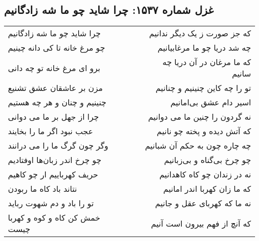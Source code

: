 \begin{center}
\section*{غزل شماره ۱۵۳۷: چرا شاید چو ما شه زادگانیم}
\label{sec:1537}
\begin{longtable}{l p{0.5cm} r}
چرا شاید چو ما شه زادگانیم
&&
که جز صورت ز یک دیگر ندانیم
\\
چو مرغ خانه تا کی دانه چینیم
&&
چه شد دریا چو ما مرغابیانیم
\\
برو ای مرغ خانه تو چه دانی
&&
که ما مرغان در آن دریا چه سانیم
\\
مزن بر عاشقان عشق تشنیع
&&
تو را چه کاین چنینیم و چنانیم
\\
چنینیم و چنان و هر چه هستیم
&&
اسیر دام عشق بی‌امانیم
\\
چرا از جهل بر ما می دوانی
&&
نه گردون را چنین ما می دوانیم
\\
عجب نبود اگر ما را بخایند
&&
که آتش دیده و پخته چو نانیم
\\
وگر چون گرگ ما را می درانند
&&
چه چاره چون به حکم آن شبانیم
\\
چو چرخ اندر زبان‌ها اوفتادیم
&&
چو چرخ بی‌گناه و بی‌زبانیم
\\
حریف کهرباییم ار چو کاهیم
&&
نه در زندان چو کاه کاهدانیم
\\
نتاند باد کاه ما ربودن
&&
که ما زان کهربا اندر امانیم
\\
تو را باد و دم شهوت رباید
&&
نه ما که کهربای عقل و جانیم
\\
خمش کن کاه و کوه و کهربا چیست
&&
که آنچ از فهم بیرون است آنیم
\\
\end{longtable}
\end{center}
